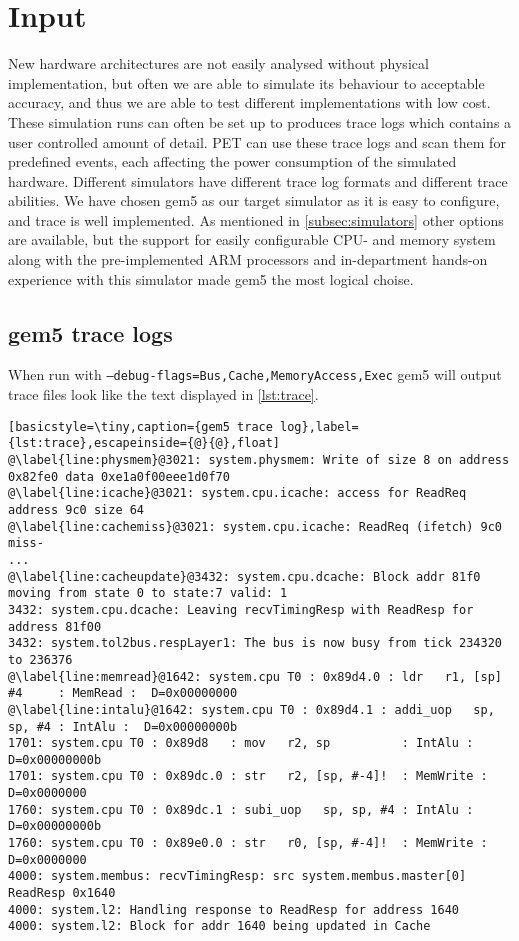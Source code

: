 \section{Input}
New hardware architectures are not easily analysed without physical
implementation, but often we are able to simulate its behaviour to acceptable
accuracy, and thus we are able to test different implementations with low cost.
These simulation runs can often be set up to produces trace logs which contains
a user controlled amount of detail. PET can use these trace logs and scan them
for predefined events, each affecting the power consumption of the simulated
hardware. Different simulators have different trace log formats and different
trace abilities. We have chosen gem5 as our target simulator as it is easy to
configure, and trace is well implemented. As mentioned in
\autoref{subsec:simulators} other options are available, but the support for
easily configurable CPU- and memory system along with the pre-implemented ARM
processors and in-department hands-on experience with this simulator made gem5
the most logical choise.

\subsection{gem5 trace logs}
When run with \texttt{--debug-flags=Bus,Cache,MemoryAccess,Exec} gem5 will output trace files look like
the text displayed in \autoref{lst:trace}.

\begin{lstlisting}[basicstyle=\tiny,caption={gem5 trace log},label={lst:trace},escapeinside={@}{@},float]
@\label{line:physmem}@3021: system.physmem: Write of size 8 on address 0x82fe0 data 0xe1a0f00eee1d0f70
@\label{line:icache}@3021: system.cpu.icache: access for ReadReq address 9c0 size 64
@\label{line:cachemiss}@3021: system.cpu.icache: ReadReq (ifetch) 9c0 miss-
...
@\label{line:cacheupdate}@3432: system.cpu.dcache: Block addr 81f0 moving from state 0 to state:7 valid: 1
3432: system.cpu.dcache: Leaving recvTimingResp with ReadResp for address 81f00
3432: system.tol2bus.respLayer1: The bus is now busy from tick 234320 to 236376
@\label{line:memread}@1642: system.cpu T0 : 0x89d4.0 : ldr   r1, [sp] #4     : MemRead :  D=0x00000000
@\label{line:intalu}@1642: system.cpu T0 : 0x89d4.1 : addi_uop   sp, sp, #4 : IntAlu :  D=0x00000000b
1701: system.cpu T0 : 0x89d8   : mov   r2, sp          : IntAlu :  D=0x00000000b
1701: system.cpu T0 : 0x89dc.0 : str   r2, [sp, #-4]!  : MemWrite :  D=0x0000000
1760: system.cpu T0 : 0x89dc.1 : subi_uop   sp, sp, #4 : IntAlu :  D=0x00000000b
1760: system.cpu T0 : 0x89e0.0 : str   r0, [sp, #-4]!  : MemWrite :  D=0x0000000
4000: system.membus: recvTimingResp: src system.membus.master[0] ReadResp 0x1640
4000: system.l2: Handling response to ReadResp for address 1640
4000: system.l2: Block for addr 1640 being updated in Cache
\end{lstlisting}

